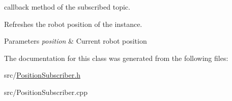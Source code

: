 callback method of the subscribed topic. 

Refreshes the robot position of the instance.


\begin{DoxyParams}{Parameters}
{\em position} & Current robot position \\
\hline
\end{DoxyParams}


The documentation for this class was generated from the following files\-:\begin{DoxyCompactItemize}
\item 
src/\hyperlink{PositionSubscriber_8h}{Position\-Subscriber.\-h}\item 
src/Position\-Subscriber.\-cpp\end{DoxyCompactItemize}
